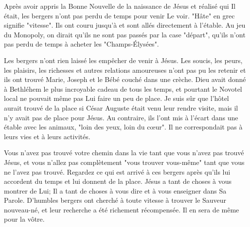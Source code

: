 

Après avoir appris la Bonne Nouvelle de la naissance de Jésus et réalisé qui Il était, les bergers n'ont pas perdu de temps pour venir Le voir. "Hâte" en grec signifie "vitesse". Ils ont couru jusqu'à et sont allés directement à l'étable. Au jeu du Monopoly, on dirait qu'ils ne sont pas passés par la case "départ", qu'ils n'ont pas perdu de temps à acheter les "Champs-Élysées".

Les bergers n'ont rien laissé les empêcher de venir à Jésus. Les soucis, les peurs, les plaisirs, les richesses et autres relations amoureuses n'ont pas pu les retenir et ils ont trouvé Marie, Joseph et le Bébé couché dans une crèche. Dieu avait donné à Bethléhem le plus incroyable cadeau de tous les temps, et pourtant le Novotel local ne pouvait même pas Lui faire un peu de place. Je suis sûr que l'hôtel aurait trouvé de la place si César Auguste était venu leur rendre visite, mais il n'y avait pas de place pour Jésus. Au contraire, ils l'ont mis à l'écart dans une étable avec les animaux, "loin des yeux, loin du cœur". Il ne correspondait pas à leurs vies et à leurs activités.

Vous n'avez pas trouvé votre chemin dans la vie tant que vous n'avez pas trouvé Jésus, et vous n'allez pas complètement "vous trouver vous-même" tant que vous ne l'avez pas trouvé. Regardez ce qui est arrivé à ces bergers après qu'ils lui accordent du temps et lui donnent de la place. Jésus a tant de choses à vous montrer de Lui; Il a tant de choses à vous dire et à vous enseigner dans Sa Parole. D'humbles bergers ont cherché à toute vitesse à trouver le Sauveur nouveau-né, et leur recherche a été richement récompensée. Il en sera de même pour la vôtre.




